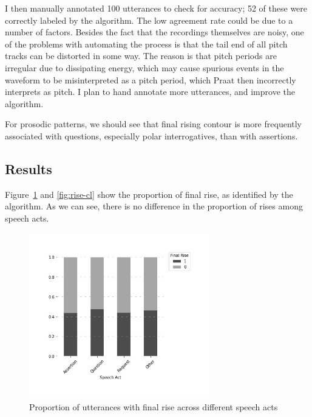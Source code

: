 I then manually annotated 100 utterances to check for accuracy; 52 of these were correctly labeled by the algorithm. The low agreement rate could be due to a number of factors. Besides the fact that the recordings themselves are noisy, one of the problems with automating the process is that the tail end of all pitch tracks can be distorted in some way. The reason is that pitch periods are irregular due to dissipating energy, which may cause spurious events in the waveform to be misinterpreted as a pitch period, which Praat then incorrectly interprets as pitch. I plan to hand annotate more utterances, and improve the algorithm.




For prosodic patterns, we should see that final rising contour is more frequently associated with questions, especially polar interrogatives, than with assertions.

\subsection{Results}
\label{sec:engsp:results:prosody}

Figure~\ref{fig:rise-sp} and \ref{fig:rise-cl} show the proportion of final rise, as identified by the algorithm. As we can see, there is no difference in the proportion of rises among speech acts. 

\begin{figure}[H]
    \centering
    \includegraphics[width=0.7\textwidth]{figures/rise-sp.jpg}
    \caption{Proportion of utterances with final rise across different speech acts}
    \label{fig:rise-sp}
\end{figure}


